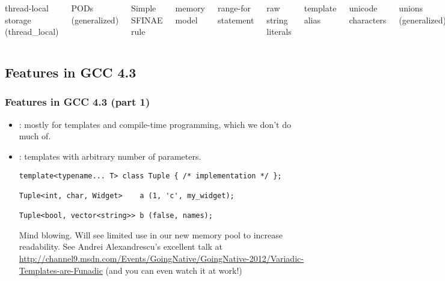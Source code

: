 \begin{frame}[fragile]
\begin{columns}[t]
{thread-local storage (thread\_local)


}

{\scriptsize
PODs (generalized)

Simple SFINAE rule

memory model

range-for statement

raw string literals


template alias

unicode characters

unions (generalized)

user-defined literals


\vskip 12pt


}
\end{columns}

\end{frame}




\subsection[Features in GCC 4.3]{ Features in GCC 4.3}\lyxframeend{}

\begin{frame}[fragile,t]
\frametitle{ Features in GCC 4.3 (part 1)}

\begin{itemize}
\item{} : mostly
for templates and compile-time programming, which we don't do much of.

\vskip 12pt

\item{}: templates with arbitrary number of parameters.
{\scriptsize
\begin{verbatim}
template<typename... T> class Tuple { /* implementation */ };

Tuple<int, char, Widget>    a (1, 'c', my_widget);

Tuple<bool, vector<string>> b (false, names);
\end{verbatim}
}
Mind blowing.  Will see limited use in our new memory pool to increase
readability.  See Andrei Alexandrescu's excellent talk at
{\small \url{http://channel9.msdn.com/Events/GoingNative/GoingNative-2012/Variadic-Templates-are-Funadic}}
(and you can even watch it at work!)


\end{itemize}

\end{frame}


